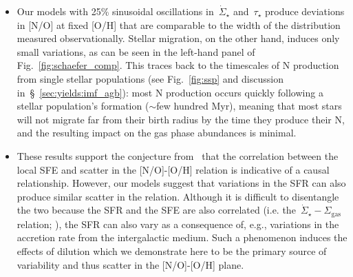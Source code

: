 \documentclass[ms.tex]{subfiles}
\begin{document}
\begin{itemize}
	\item Our models with 25\% sinusoidal oscillations in~$\dot{\Sigma}_\star$ 
	and~$\tau_\star$ produce deviations in [N/O] at fixed [O/H] that are 
	comparable to the width of the distribution measured observationally. 
	Stellar migration, on the other hand, induces only small variations, as can 
	be seen in the left-hand panel of Fig.~\ref{fig:schaefer_comp}. 
	This traces back to the timescales of N production from single stellar 
	populations (see Fig.~\ref{fig:ssp} and discussion 
	in~\S~\ref{sec:yields:imf_agb}): most N production occurs quickly 
	following a stellar population's formation ($\sim$few hundred Myr), meaning 
	that most stars will not migrate far from their birth radius by the time 
	they produce their N, and the resulting impact on the gas phase abundances 
	is minimal. 

	\item These results support the conjecture from~\citet{Schaefer2020} that 
	the correlation between the local SFE and scatter in the [N/O]-[O/H] 
	relation is indicative of a causal relationship. 
	However, our models suggest that variations in the SFR can also produce 
	similar scatter in the relation. 
	Although it is difficult to disentangle the two because the SFR and the SFE 
	are also correlated (i.e. 
	the~$\dot{\Sigma}_\star - \Sigma_\text{gas}$ relation; 
	\citealp[e.g.][]{Kennicutt1998, delosReyes2019, Kennicutt2021}), the SFR 
	can also vary as a consequence of, e.g., variations in the accretion rate 
	from the intergalactic medium. 
	Such a phenomenon induces the effects of dilution which we demonstrate here 
	to be the primary source of variability and thus scatter in the [N/O]-[O/H] 
	plane. 

\end{itemize} 
\end{document}
